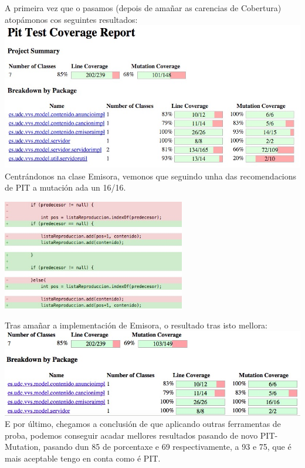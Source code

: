 \documentclass[DIV=calc,paper=a4,fontsize=11pt,onecolumn]{scrartcl}	 %
\begin{document}
\begin{itemize}
		A primeira vez que o pasamos (depois de amañar as carencias de Cobertura) atopámonos cos seguintes resultados: \\
		
		\includegraphics[width=15cm]{Imagenes/pit-inicio.jpg} \\
		
		Centrándonos na clase Emisora, vemonos que seguindo unha das recomendacions de PIT a mutación ada un 16/16. \\
		
		\begin{center}
		\includegraphics[width=8cm]{Imagenes/cambios-pit.jpg}
		\end{center}
		
		Tras amañar a implementación de Emisora, o resultado tras isto mellora: \\
		
		\includegraphics[width=15cm]{Imagenes/pit-medio.jpg} \\
		
		E por último, chegamos a conclusión de que aplicando outras ferramentas de proba, podemos conseguir acadar mellores resultados pasando de novo PIT-Mutation, pasando dun 85 de porcentaxe e 69 respectivamente, a 93 e 75, que é mais aceptable tengo en conta como é PIT.  \\
		

\end{itemize}
\end{document}
